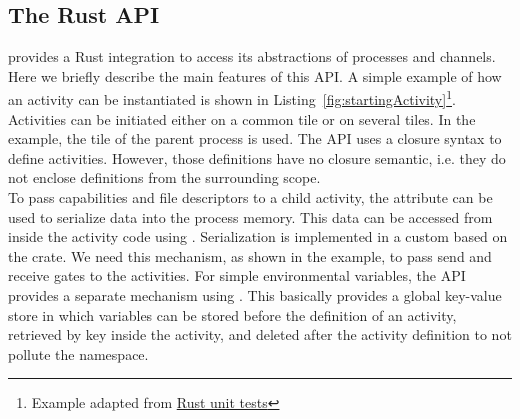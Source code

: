 \subsection{The Rust API}
\md provides a Rust integration to access its abstractions of processes and channels. Here we briefly describe the main features of this API. A simple example of how an activity can be instantiated is shown in Listing~\ref{fig:startingActivity}\footnote{Example adapted from \href{https://github.com/Barkhausen-Institut/M3/blob/master/src/apps/rustunittests/src/tactivity.rs}{\md Rust unit tests}}. Activities can be initiated either on a common tile or on several tiles. In the example, the tile of the parent process is used. The API uses a closure syntax to define activities. However, those definitions have no closure semantic, i.e. they do not enclose definitions from the surrounding scope.\\

To pass capabilities and file descriptors to a child activity, the attribute  can be used to serialize data into the process memory. This data can be accessed from inside the activity code using . Serialization is implemented in a custom  based on the  crate. We need this mechanism, as shown in the example, to pass send and receive gates to the activities. For simple environmental variables, the API provides a separate mechanism using . This basically provides a global key-value store in which variables can be stored before the definition of an activity, retrieved by key inside the activity, and deleted after the activity definition to not pollute the namespace.\\


